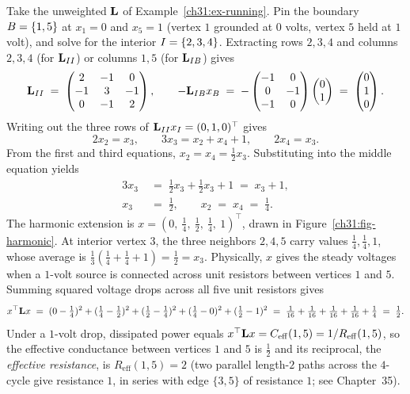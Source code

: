 \begin{example}\label{ch31:ex-harmonic}
Take the unweighted $\mathbf{L}$ of Example~\ref{ch31:ex-running}. Pin the boundary $B=\{1,5\}$ at $x_1 = 0$ and $x_5 = 1$ (vertex $1$ grounded at $0$ volts, vertex $5$ held at $1$ volt), and solve for the interior $I=\{2,3,4\}$. Extracting rows $2,3,4$ and columns $2,3,4$ (for $\mathbf{L}_{II}$) or columns $1,5$ (for $\mathbf{L}_{IB}$) gives
\[
  \mathbf{L}_{II} \;=\; \begin{pmatrix} 2 & -1 & 0\\ -1 & 3 & -1\\ 0 & -1 & 2\end{pmatrix},
  \qquad
  -\mathbf{L}_{IB}x_B \;=\; -\begin{pmatrix} -1 & 0\\ 0 & -1\\ -1 & 0\end{pmatrix}\begin{pmatrix}0\\1\end{pmatrix}
  \;=\; \begin{pmatrix}0\\1\\0\end{pmatrix}.
\]
Writing out the three rows of $\mathbf{L}_{II}x_I = (0,1,0)^\top$ gives
\[
  2x_2 = x_3,\qquad 3x_3 = x_2 + x_4 + 1,\qquad 2x_4 = x_3 .
\]
From the first and third equations, $x_2 = x_4 = \tfrac12 x_3$. Substituting into the middle equation yields
\begin{align*}
  3x_3 &\;=\; \tfrac12 x_3 + \tfrac12 x_3 + 1 \;=\; x_3 + 1,\\
  x_3  &\;=\; \tfrac12, \qquad x_2 \;=\; x_4 \;=\; \tfrac14 .
\end{align*}
The harmonic extension is $x = (0,\ \tfrac14,\ \tfrac12,\ \tfrac14,\ 1)^\top$, drawn in Figure~\ref{ch31:fig-harmonic}. At interior vertex $3$, the three neighbors $2,4,5$ carry values $\tfrac14,\tfrac14,1$, whose average is $\tfrac13(\tfrac14 + \tfrac14 + 1) = \tfrac12 = x_3$. Physically, $x$ gives the steady voltages when a $1$-volt source is connected across unit resistors between vertices $1$ and $5$. Summing squared voltage drops across all five unit resistors gives
\[
  x^\top \mathbf{L} x
  \;=\; (0-\tfrac14)^2 + (\tfrac14-\tfrac12)^2 + (\tfrac12-\tfrac14)^2 + (\tfrac14-0)^2 + (\tfrac12-1)^2
  \;=\; \tfrac{1}{16} + \tfrac{1}{16} + \tfrac{1}{16} + \tfrac{1}{16} + \tfrac{1}{4}
  \;=\; \tfrac12 .
\]
Under a $1$-volt drop, dissipated power equals $x^\top\mathbf{L} x = C_{\mathrm{eff}}(1,5) = 1/R_{\mathrm{eff}}(1,5)$, so the effective conductance between vertices $1$ and $5$ is $\tfrac12$ and its reciprocal, the \emph{effective resistance}, is $R_{\mathrm{eff}}(1,5) = 2$ (two parallel length-$2$ paths across the $4$-cycle give resistance $1$, in series with edge $\{3,5\}$ of resistance $1$; see Chapter~35).
\end{example}

